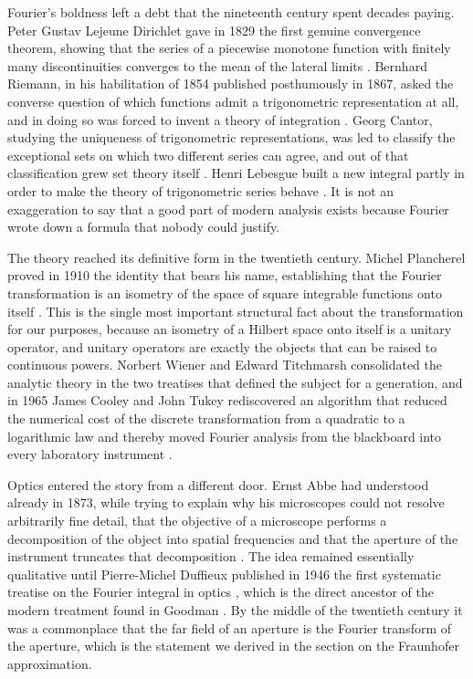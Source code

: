 		Fourier's boldness left a debt that the nineteenth century spent decades paying. Peter Gustav Lejeune Dirichlet gave in 1829 the first genuine convergence theorem, showing that the series of a piecewise monotone function with finitely many discontinuities converges to the mean of the lateral limits \citep{dirichlet1829convergence}. Bernhard Riemann, in his habilitation of 1854 published posthumously in 1867, asked the converse question of which functions admit a trigonometric representation at all, and in doing so was forced to invent a theory of integration \citep{riemann1867darstellbarkeit}. Georg Cantor, studying the uniqueness of trigonometric representations, was led to classify the exceptional sets on which two different series can agree, and out of that classification grew set theory itself \citep{cantor1872ausdehnung}. Henri Lebesgue built a new integral partly in order to make the theory of trigonometric series behave \citep{lebesgue1903series}. It is not an exaggeration to say that a good part of modern analysis exists because Fourier wrote down a formula that nobody could justify.

		The theory reached its definitive form in the twentieth century. Michel Plancherel proved in 1910 the identity that bears his name, establishing that the Fourier transformation is an isometry of the space of square integrable functions onto itself \citep{plancherel1910contribution}. This is the single most important structural fact about the transformation for our purposes, because an isometry of a Hilbert space onto itself is a unitary operator, and unitary operators are exactly the objects that can be raised to continuous powers. Norbert Wiener \citeyearpar{wiener1933fourier} and Edward Titchmarsh \citeyearpar{titchmarsh1937introduction} consolidated the analytic theory in the two treatises that defined the subject for a generation, and in 1965 James Cooley and John Tukey rediscovered an algorithm that reduced the numerical cost of the discrete transformation from a quadratic to a logarithmic law and thereby moved Fourier analysis from the blackboard into every laboratory instrument \citep{cooley1965algorithm}.

		Optics entered the story from a different door. Ernst Abbe had understood already in 1873, while trying to explain why his microscopes could not resolve arbitrarily fine detail, that the objective of a microscope performs a decomposition of the object into spatial frequencies and that the aperture of the instrument truncates that decomposition \citep{abbe1873beitrage}. The idea remained essentially qualitative until Pierre-Michel Duffieux published in 1946 the first systematic treatise on the Fourier integral in optics \citep{duffieux1946integrale}, which is the direct ancestor of the modern treatment found in Goodman \citeyearpar{goodman2005introduction}. By the middle of the twentieth century it was a commonplace that the far field of an aperture is the Fourier transform of the aperture, which is the statement we derived in the section on the Fraunhofer approximation.

